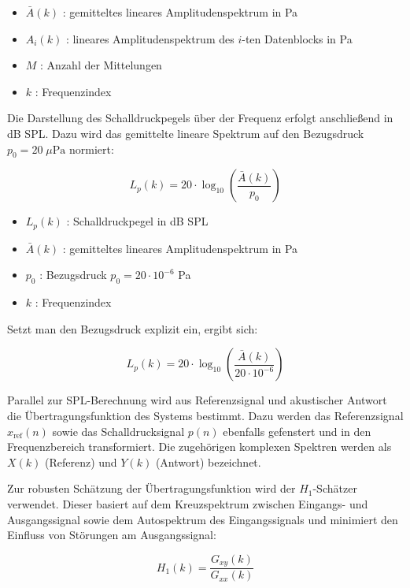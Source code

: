 \begin{itemize}
    \item $\bar{A}(k)$ : gemitteltes lineares Amplitudenspektrum in Pa
    \item $A_i(k)$ : lineares Amplitudenspektrum des $i$-ten Datenblocks in Pa
    \item $M$ : Anzahl der Mittelungen
    \item $k$ : Frequenzindex
\end{itemize}

Die Darstellung des Schalldruckpegels über der Frequenz erfolgt anschließend in dB SPL. Dazu wird das gemittelte lineare Spektrum auf den Bezugsdruck $p_0 = 20\;\mu\mathrm{Pa}$ normiert:

\begin{equation}
L_p(k) = 20 \cdot \log_{10}\left(\frac{\bar{A}(k)}{p_0}\right)
\end{equation}

\begin{itemize}
    \item $L_p(k)$ : Schalldruckpegel in dB SPL
    \item $\bar{A}(k)$ : gemitteltes lineares Amplitudenspektrum in Pa
    \item $p_0$ : Bezugsdruck $p_0 = 20 \cdot 10^{-6}$ Pa
    \item $k$ : Frequenzindex
\end{itemize}

Setzt man den Bezugsdruck explizit ein, ergibt sich:

\begin{equation}
L_p(k) = 20 \cdot \log_{10}\left(\frac{\bar{A}(k)}{20 \cdot 10^{-6}}\right)
\end{equation}

Parallel zur SPL-Berechnung wird aus Referenzsignal und akustischer Antwort die Übertragungsfunktion des Systems bestimmt. Dazu werden das Referenzsignal $x_{\mathrm{ref}}(n)$ sowie das Schalldrucksignal $p(n)$ ebenfalls gefenstert und in den Frequenzbereich transformiert. Die zugehörigen komplexen Spektren werden als $X(k)$ (Referenz) und $Y(k)$ (Antwort) bezeichnet.

Zur robusten Schätzung der Übertragungsfunktion wird der $H_1$-Schätzer verwendet. Dieser basiert auf dem Kreuzspektrum zwischen Eingangs- und Ausgangssignal sowie dem Autospektrum des Eingangssignals und minimiert den Einfluss von Störungen am Ausgangssignal:

\begin{equation}
H_1(k) = \frac{G_{xy}(k)}{G_{xx}(k)}
\end{equation}

